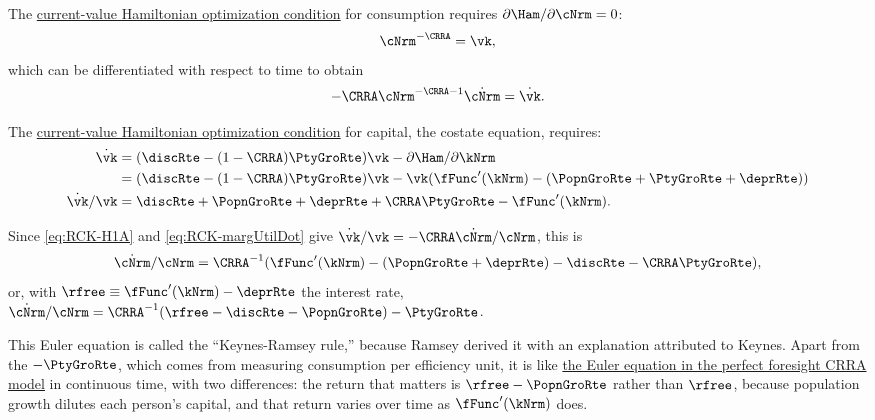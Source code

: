 \documentclass{econark}
\begin{document}
The \href{https://intertemporal-choice.github.io/content/appendices/mathematical/hamiltonianvsdiscrete/\#eq-uceqvk}{current-value Hamiltonian optimization condition} for consumption requires $\partial
\Ham/\partial \cNrm = 0$:
\begin{equation}
  \cNrm^{-\CRRA} = \vk , \label{eq:RCK-H1A}
\end{equation}
which can be differentiated with respect to time to obtain
\begin{equation}
  -\CRRA \cNrm^{-\CRRA-1}\dot{\cNrm} = \dot{\vk} . \label{eq:RCK-margUtilDot}
\end{equation}

The \href{https://intertemporal-choice.github.io/content/appendices/mathematical/hamiltonianvsdiscrete/\#eq-lamgrow}{current-value Hamiltonian optimization condition} for capital, the costate equation, requires:
\begin{equation}\begin{gathered}\begin{aligned}
  \dot{\vk} & =  (\discRte-(1-\CRRA)\PtyGroRte)\vk - \partial \Ham/\partial \kNrm  \\
                & =  (\discRte-(1-\CRRA)\PtyGroRte)\vk - \vk (\fFunc^{\prime}(\kNrm) - (\PopnGroRte+\PtyGroRte+\deprRte))  \\
  \dot{\vk}/{\vk} & =  \discRte+\PopnGroRte+\deprRte+\CRRA \PtyGroRte-\fFunc^{\prime}(\kNrm) .
\end{aligned}\end{gathered}\end{equation}

Since \eqref{eq:RCK-H1A} and \eqref{eq:RCK-margUtilDot} give $\dot{\vk}/\vk = -\CRRA\dot{\cNrm}/\cNrm$, this is
\begin{equation}
  \dot{\cNrm}/\cNrm = \CRRA^{-1}(\fFunc^{\prime}(\kNrm)-(\PopnGroRte+\deprRte)-\discRte - \CRRA \PtyGroRte), \label{eq:cdotOc}
\end{equation}
or, with $\rfree \equiv \fFunc^{\prime}(\kNrm) - \deprRte$ the interest rate, $\dot{\cNrm}/\cNrm = \CRRA^{-1}(\rfree - \discRte - \PopnGroRte) - \PtyGroRte$.

This Euler equation is called the ``Keynes-Ramsey rule,'' because Ramsey derived it
with an explanation attributed to Keynes.
Apart from the $-\PtyGroRte$, which comes from measuring consumption per efficiency unit, it is like \href{https://intertemporal-choice.github.io/content/consumption/perfforesightcrra/#eq-pfcrra-cgrow}{the Euler equation in the perfect foresight CRRA model} in continuous time, with two differences: the return that matters is $\rfree-\PopnGroRte$ rather than $\rfree$, because population growth dilutes each person's capital, and that return varies over time as $\fFunc^{\prime}(\kNrm)$ does.
\end{document}
